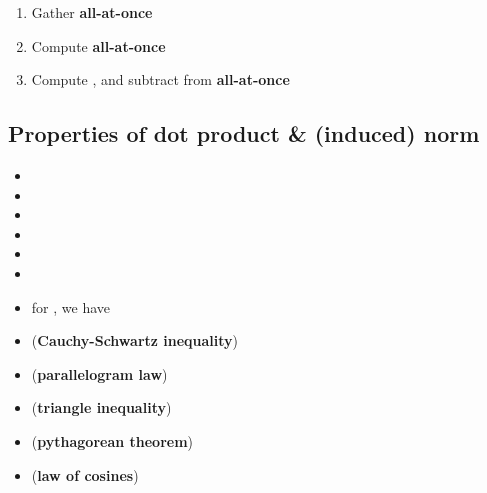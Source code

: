 \begin{itemize}
\begin{itemize}
\begin{enumerate}
    \item
      Gather
      \textbf{all-at-once}
    \item
      Compute
      \textbf{all-at-once}
    \item
      Compute , and
      subtract from  \textbf{all-at-once}
    \end{enumerate}
  \end{itemize}
\end{itemize}

\subsection*{Properties of dot product \& (induced)
norm}

\begin{itemize}

\item
\item
\item
\item
\item
\item
\item
  for , we have
\item
  (\textbf{Cauchy-Schwartz inequality})
\item
  (\textbf{parallelogram law})
\item
  (\textbf{triangle inequality})
\item
  (\textbf{pythagorean theorem})
\item
  (\textbf{law of cosines})
\end{itemize}

